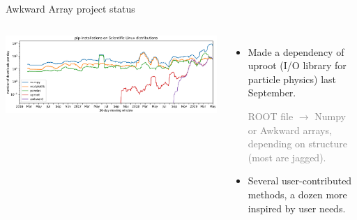 \documentclass[aspectratio=169]{beamer}
\begin{document}
\begin{frame}{Awkward Array project status}
\large
\begin{columns}
\begin{center}
\includegraphics[width=0.9\linewidth]{pip-scientificlinux-uproot.pdf}
\end{center}

\vspace{-0.35 cm}
\begin{itemize}\setlength{\itemsep}{0.25 cm}
\item Made a dependency of uproot (I/O library for particle physics) last September.

\textcolor{gray}{\normalsize ROOT file $\to$ Numpy or Awkward arrays, depending on structure (most are jagged).}

\item Several user-contributed methods, a dozen more inspired by user needs.
\end{itemize}
\end{columns}
\end{frame}
\end{document}
